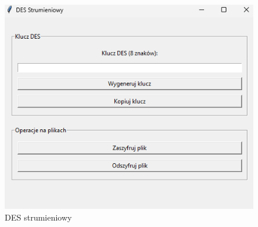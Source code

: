 \documentclass[12pt,a4paper]{article}
\begin{document}
\begin{figure}[!htb]
\begin{center}
\includegraphics[scale=0.45]{pictures/desstrumieniowy.png}
\caption{DES strumieniowy}
\label{fig:DES strumieniowy}
\end{center}
\end{figure}


\newpage
\end{document}
